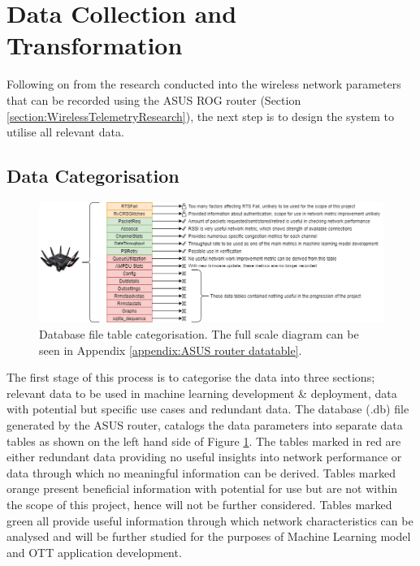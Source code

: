 \section{Data Collection and Transformation}
\label{data_collection_design}

Following on from the research conducted into the wireless network parameters that can be recorded using the ASUS ROG router (Section \ref{section:WirelessTelemetryResearch}), the next step is to design the system to utilise all relevant data. 

\subsection{Data Categorisation}
\label{Section: Data Categorisation}

\begin{figure} [ht]
    \centering
    \includegraphics[width=1\linewidth]{pages/Chapter3/Chapter 3 images/router_data-Datasets-Usefulness.png}
    \caption{Database file table categorisation. The full  scale  diagram  can be seen in Appendix \ref{appendix:ASUS router datatable}.}
    \label{fig_ASUSDatatables}
\end{figure}

The first stage of this process is to categorise the data into three sections; relevant data to be used in machine learning development \& deployment, data with potential but specific use cases and redundant data. The database (.db) file generated by the ASUS router, catalogs the data parameters into separate data tables as shown on the left hand side of Figure \ref{fig_ASUSDatatables}. The tables marked in red are either redundant data providing no useful insights into network performance or data through  which no meaningful information can be derived. Tables marked orange present beneficial information with potential for use but are not within the scope of this project, hence will not be further considered. Tables marked green all provide useful information through which network characteristics can be analysed and will be further studied for the purposes of Machine Learning model and OTT application development.  


